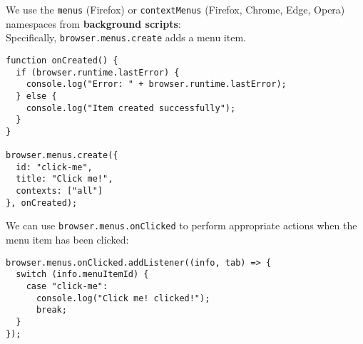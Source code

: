 \documentclass[../index.tex]{subfiles}
\begin{document}
\begin{frame}[fragile]{\currenttitle}
  We use the \texttt{menus} (Firefox) or \texttt{contextMenus} (Firefox,
  Chrome, Edge, Opera) namespaces from \textbf{background scripts}: \\[1em]

  Specifically, \texttt{browser.menus.create} adds a menu item.
\end{frame}

\begin{frame}[fragile]{\currenttitle}
  \begin{lstlisting}[language=ES6]
function onCreated() {
  if (browser.runtime.lastError) {
    console.log("Error: " + browser.runtime.lastError);
  } else {
    console.log("Item created successfully");
  }
}

browser.menus.create({
  id: "click-me",
  title: "Click me!",
  contexts: ["all"]
}, onCreated);
  \end{lstlisting}
\end{frame}

\begin{frame}[fragile]{\currenttitle}
  We can use \texttt{browser.menus.onClicked} to perform appropriate actions
  when the menu item has been clicked: \\[1em]
  \begin{lstlisting}[language=ES6]
browser.menus.onClicked.addListener((info, tab) => {
  switch (info.menuItemId) {
    case "click-me":
      console.log("Click me! clicked!");
      break;
  }
});
  \end{lstlisting}
\end{frame}

\end{document}
